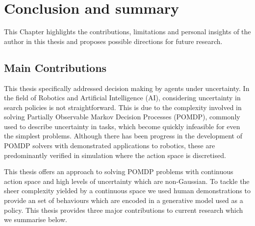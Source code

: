 \chapter{Conclusion and summary}

This Chapter highlights the contributions, limitations and personal insights of the author in this thesis and 
proposes possible directions for future research.





\section{Main Contributions}

This thesis specifically addressed decision making by agents under uncertainty. 
In the field of Robotics and Artificial Intelligence (AI), considering uncertainty in search policies is not straightforward. 
This is due to the complexity involved in solving Partially Observable Markov Decision Processes (POMDP), 
commonly used to describe uncertainty in tasks, which become quickly infeasible for even the simplest problems. 
Although there has been progress in the development of POMDP solvers with demonstrated applications to robotics, 
these are predominantly verified in simulation where the action space is discretised.  

This thesis offers an approach to solving POMDP problems with continuous action space and high levels of uncertainty which 
are non-Gaussian. To tackle the sheer complexity yielded by a continuous space we used human demonstrations to provide an 
set of behaviours which are encoded in a generative model used as a policy. This thesis provides three major contributions to 
current research which we summarise below.

